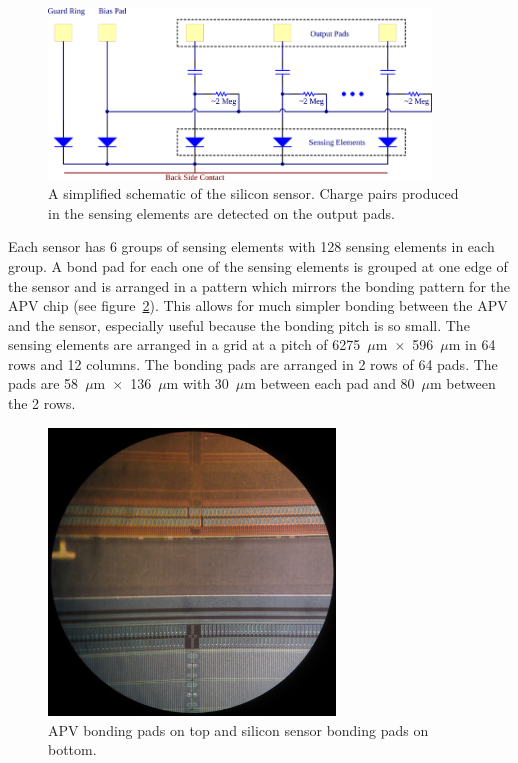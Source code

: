 \documentclass[preprint,12pt]{elsarticle}
\begin{document}
\begin{figure}[h]
\begin{center}
\includegraphics[width=4in, keepaspectratio=true, angle=0]{graphics/sensor_sch.png}
\caption{A simplified schematic of the silicon sensor.  Charge pairs produced in
the sensing elements are detected on the output pads.
\label{fig:sensor_sch}}
\end{center}
\end{figure}
%
Each sensor has 6 groups of sensing elements with 128 sensing elements in each
group. A bond pad for each one of the sensing elements is grouped at one edge
of the sensor and is arranged in a pattern which mirrors the bonding pattern for
the APV chip (see figure~\ref{fig:bonding_pads}). This allows for much simpler bonding between the APV and the
sensor, especially useful because the bonding pitch is so small. The sensing
elements are arranged in a grid at a pitch of 6275~$\mu$m~$\times$~596~$\mu$m in 64 rows and 12
columns. The bonding pads are arranged in 2 rows of 64 pads. The pads are
58~$\mu$m~$\times$~136~$\mu$m with 30~$\mu$m between each pad and 80~$\mu$m between the 2 rows.

\begin{figure}[ht]
\begin{center}
\includegraphics[width=3in, keepaspectratio=true, angle=0]{graphics/bonding_pads.jpg}
\caption{APV bonding pads on top and silicon sensor bonding pads on bottom.
\label{fig:bonding_pads}}
\end{center}
\end{figure}
%
\end{document}

